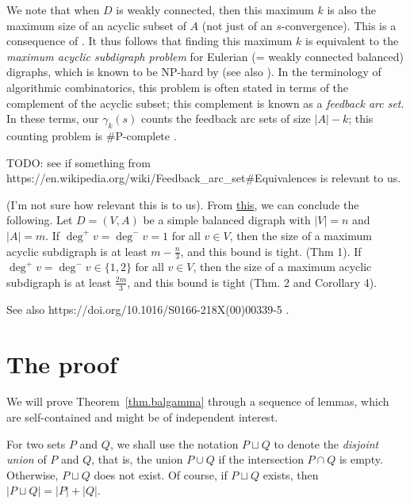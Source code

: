 \documentclass[numbers=enddot,12pt,final,onecolumn,notitlepage]{scrartcl}%
\theoremstyle{definition}
\newenvironment{noncompile}{}{}
\theoremstyle{plainsl}
\begin{document}
\begin{enumerate}
We note that when $D$ is weakly connected, then this maximum $k$ is also the
maximum size of an acyclic subset of $A$ (not just of an $s$-convergence).
This is a consequence of \cite[Theorem 3.4]{PerPha15}. It thus follows that
finding this maximum $k$ is equivalent to the \emph{maximum acyclic subdigraph
problem} for Eulerian (= weakly connected balanced) digraphs, which is known
to be NP-hard by \cite[Theorem 3.10]{PerPha15} (see also \cite[\S 3.7.1 and
Lemma 4.4.3]{BanGut18}). In the terminology of algorithmic combinatorics, this
problem is often stated in terms of the complement of the acyclic subset; this
complement is known as a \emph{feedback arc set}. In these terms, our
$\gamma_{k}\left(  s\right)  $ counts the feedback arc sets of size
$\left\vert A\right\vert -k$; this counting problem is \#P-complete
\cite[Theorem 5]{Perrot19}.
\end{enumerate}

\begin{noncompile}
TODO: see if something from
https://en.wikipedia.org/wiki/Feedback\_arc\_set\#Equivalences is relevant to us.

(I'm not sure how relevant this is to us). From
\href{https://link.springer.com/chapter/10.1007/978-3-642-45043-3_26}{this},
we can conclude the following. Let $D=(V,A)$ be a simple balanced digraph with
$|V|=n$ and $|A|=m$. If $\deg^{+}v=\deg^{-}v=1$ for all $v\in V$, then the
size of a maximum acyclic subdigraph is at least $m-\frac{n}{3}$, and this
bound is tight. (Thm 1). If $\deg^{+}v=\deg^{-}v\in\{1,2\}$ for all $v\in V$,
then the size of a maximum acyclic subdigraph is at least $\frac{2m}{3}$, and
this bound is tight (Thm. 2 and Corollary 4).

See also https://doi.org/10.1016/S0166-218X(00)00339-5 .
\end{noncompile}

\section{The proof}

We will prove Theorem~\ref{thm.balgamma} through a sequence of lemmas, which
are self-contained and might be of independent interest.

For two sets $P$ and $Q$, we shall use the notation $P\sqcup Q$ to denote the
\emph{disjoint union} of $P$ and $Q$, that is, the union $P\cup Q$ if the
intersection $P\cap Q$ is empty. Otherwise, $P\sqcup Q$ does not exist. Of
course, if $P\sqcup Q$ exists, then $\left\vert P\sqcup Q\right\vert
=\left\vert P\right\vert +\left\vert Q\right\vert $.
\end{document}
